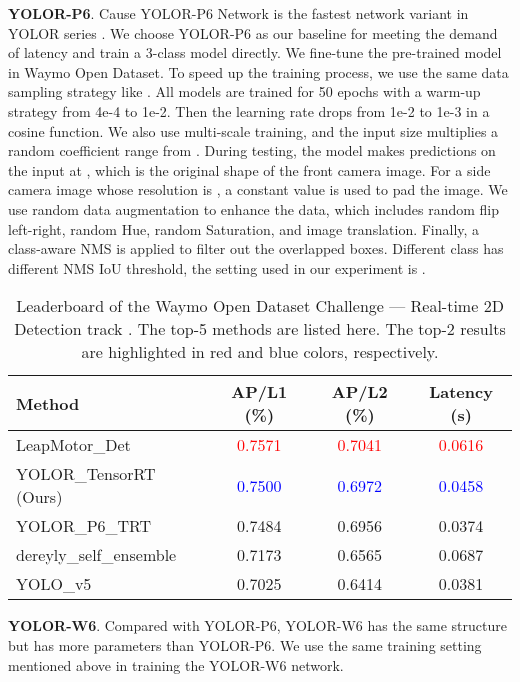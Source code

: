 \documentclass[final]{cvpr}
\begin{document}
\noindent\textbf{YOLOR-P6}.  Cause YOLOR-P6 Network is the fastest network variant in YOLOR series \cite{wang2021you}. We choose YOLOR-P6 as our baseline for meeting the demand of latency and train a 3-class model directly. We fine-tune the pre-trained model in Waymo Open Dataset. To speed up the training process, we use the same data sampling strategy like \cite{chen20202nd}. All models are trained for 50 epochs with a warm-up strategy from 4e-4 to 1e-2. Then the learning rate drops from 1e-2 to 1e-3 in a cosine function. We also use multi-scale training, and the input size multiplies a random coefficient range from . During testing, the model makes predictions on the input at , which is the original shape of the front camera image. For a side camera image whose resolution is , a constant value is used to pad the image. We use random data augmentation to enhance the data, which includes random flip left-right, random Hue, random Saturation, and image translation. Finally, a class-aware NMS is applied to filter out the overlapped boxes. Different class has different NMS IoU threshold, the setting used in our experiment is .

\begin{table*}[!ht]
\begin{center}
\caption{Leaderboard of the Waymo Open Dataset Challenge --- Real-time 2D Detection track \cite{waymowebsite}. The top-5 methods are listed here. The top-2 results are highlighted in red and blue colors, respectively.}
\begin{tabular}{l|c|c|c}
\hline
Method & AP/L1 (\%) & AP/L2 (\%) &Latency (s)\\
\hline
LeapMotor\_Det & \textcolor{red}{0.7571} & \textcolor{red}{0.7041} & \textcolor{red}{0.0616} \\
YOLOR\_TensorRT (Ours) & \textcolor{blue}{0.7500} & \textcolor{blue}{0.6972} & \textcolor{blue}{0.0458} \\
YOLOR\_P6\_TRT & 0.7484 & 0.6956 & 0.0374\\
dereyly\_self\_ensemble & 0.7173 & 0.6565 & 0.0687 \\
YOLO\_v5 & 0.7025 & 0.6414 & 0.0381 \\
\hline
\end{tabular}
\label{tab:leaderboard}
\end{center}
\end{table*}

\noindent\textbf{YOLOR-W6}. Compared with YOLOR-P6, YOLOR-W6 has the same structure but has more parameters than YOLOR-P6. We use the same training setting mentioned above in training the YOLOR-W6 network.
\end{document}
